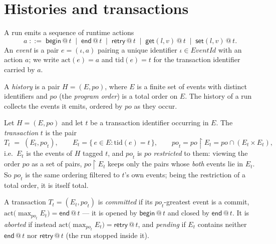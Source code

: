 \documentclass[manuscript,nonacm]{acmart}
\makeatletter
\theoremstyle{acmdefinition}
\newcommand{\bbegin}{\textsf{begin}}
\newcommand{\eend}{\textsf{end}}
\newcommand{\retry}{\textsf{retry}}
\newcommand{\getev}[3]{\textsf{get}(#1,#2)\,@\,#3}
\newcommand{\setev}[3]{\textsf{set}(#1,#2)\,@\,#3}
\newcommand{\EventId}{\mathit{EventId}}
\newcommand{\po}{\mathit{po}}
\makeatother
\begin{document}
\section{Histories and transactions}
\label{sec:history}

A run emits a sequence of runtime actions
\[
a \;::=\; \bbegin\,@\,t \;\mid\; \eend\,@\,t \;\mid\; \retry\,@\,t
      \;\mid\; \getev{l}{v}{t} \;\mid\; \setev{l}{v}{t}.
\]
An \emph{event} is a pair $e = (\iota, a)$ pairing a unique identifier
$\iota \in \EventId$ with an action $a$; we write $\mathrm{act}(e)=a$ and
$\mathrm{tid}(e)=t$ for the transaction identifier carried by $a$.

\begin{definition}[History]
A \emph{history} is a pair $H = (E, \po)$, where $E$ is a finite set of events with
distinct identifiers and $\po$ (the \emph{program order}) is a total order on $E$.
The history of a run collects the events it emits, ordered by $\po$ as they occur.
\end{definition}

\begin{definition}[Transaction]
Let $H = (E, \po)$ and let $t$ be a transaction identifier occurring in $E$. The
\emph{transaction} $t$ is the pair
\[
T_t \;=\; (E_t, \po_t),
\qquad
E_t = \{\, e \in E : \mathrm{tid}(e) = t \,\},
\qquad
\po_t = \po \restriction E_t
      = \po \cap (E_t \times E_t) ,
\]
i.e.\ $E_t$ is the events of $H$ tagged $t$, and $\po_t$ is $\po$ \emph{restricted}
to them: viewing the order $\po$ as a set of pairs, $\po \restriction E_t$ keeps
only the pairs whose \emph{both} events lie in $E_t$. So $\po_t$ is the same
ordering filtered to $t$'s own events; being the restriction of a total order, it
is itself total.
\end{definition}

\begin{definition}
A transaction $T_t = (E_t, \po_t)$ is \emph{committed} if its $\po_t$-greatest event
is a commit, $\mathrm{act}\bigl(\max_{\po_t} E_t\bigr) = \eend\,@\,t$ --- it is
opened by $\bbegin\,@\,t$ and closed by $\eend\,@\,t$. It is \emph{aborted} if
instead $\mathrm{act}\bigl(\max_{\po_t} E_t\bigr) = \retry\,@\,t$, and \emph{pending}
if $E_t$ contains neither $\eend\,@\,t$ nor $\retry\,@\,t$ (the run stopped inside
it).
\end{definition}
\end{document}

